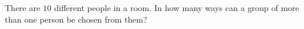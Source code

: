 There are $10$ different people in a room. In how many ways can a group of more than one person be chosen from them?
